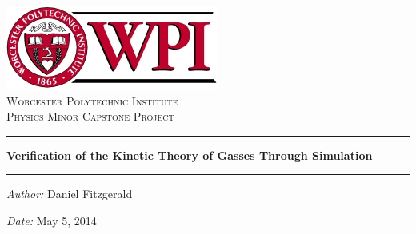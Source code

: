 \documentclass{article}
\begin{document}
\begin{titlepage}

\begin{center}

\includegraphics{Images/wpi_logo.jpg}\\[1cm]
\textsc{\LARGE Worcester Polytechnic Institute}\\[1cm]
\textsc{\Large Physics Minor Capstone Project}\\[1cm]

\hrule
\vspace{1cm}
{ \huge \bfseries Verification of the Kinetic Theory of Gasses Through Simulation}\\[1cm]
\hrule
\vspace{1cm}

\begin{minipage}{0.4\textwidth}
\begin{flushleft} \large
\emph{Author:}
Daniel Fitzgerald\\

\end{flushleft}
\end{minipage}
\begin{minipage}{0.4\textwidth}
\begin{flushright} \large
\emph{Date:}
May 5, 2014 \\

\end{flushright}
\end{minipage}
\vfill
\end{center}

\end{titlepage}


\begin{flushleft}
\begin{abstract}
The Kinetic Theory of Gasses developed by Maxwell and Boltzmann derives macroscopic properties of gasses, such as temperature and pressure, from the kinetic particle interactions as microscopic levels. The Maxwell-Boltzmann distribution for particle velocity is the probability density function that gives the probability that any given gas particle will have the given velocity. It assumes the components of the three dimensional velocity vector are normally distributed with a mean of zero. 
\end{abstract}
\end{flushleft}
\end{document}
